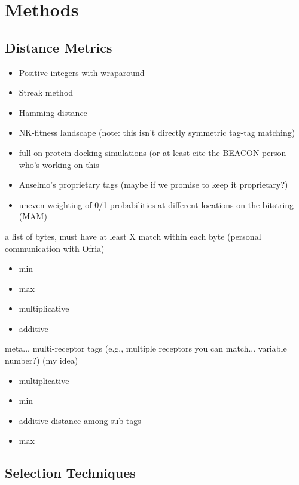 \section{Methods}

\subsection{Distance Metrics}

\begin{itemize}
\item Positive integers with wraparound \citep{spector2011tag}
\item Streak method \citep{downing2015intelligence}
\item Hamming distance \citep{lalejini2019else}
\item NK-fitness landscape \citep{kauffman1987towards} (note: this isn't directly symmetric tag-tag matching)
\item full-on protein docking simulations (or at least cite the BEACON person who's working on this
\item Anselmo's proprietary tags (maybe if we promise to keep it proprietary?)
\item uneven weighting of 0/1 probabilities at different locations on the bitstring (MAM)
\end{itemize}

a list of bytes, must have at least X match within each byte (personal communication with Ofria)
\begin{itemize}
\item min
\item max
\item multiplicative
\item additive
\end{itemize}

meta... multi-receptor tags (e.g., multiple receptors you can match... variable number?) (my idea)
\begin{itemize}
\item multiplicative
\item min
\item additive distance among sub-tags
\item max
\end{itemize}

\subsection{Selection Techniques}

